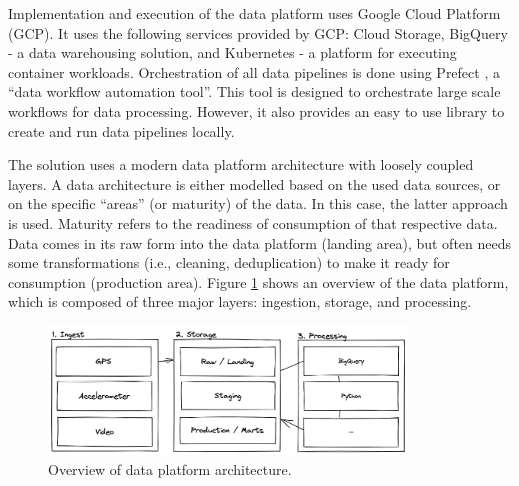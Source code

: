 Implementation and execution of the data platform uses Google Cloud Platform (GCP). It uses the following services provided by GCP: Cloud Storage, BigQuery - a data warehousing solution, and Kubernetes - a platform for executing container workloads. Orchestration of all data pipelines is done using Prefect \cite{Prefect}, a ``data workflow automation tool''. This tool is designed to orchestrate large scale workflows for data processing. However, it also provides an easy to use library to create and run data pipelines locally.

The solution uses a modern data platform architecture with loosely coupled layers. A data architecture is either modelled based on the used data sources, or on the specific ``areas'' (or maturity) of the data. In this case, the latter approach is used. Maturity refers to the readiness of consumption of that respective data. Data comes in its raw form into the data platform (landing area), but often needs some transformations (i.e., cleaning, deduplication) to make it ready for consumption (production area).  Figure \ref{fig:data-platform-architecture} shows an overview of the data platform, which is composed of three major layers: ingestion, storage, and processing.

\begin{figure}[H]
\begin{center}
\includegraphics[width=0.85\textwidth,keepaspectratio]{images/4_data/data-platform.png}
\end{center}
\captionsetup{width=.90\textwidth}
\caption{Overview of data platform architecture.}
\label{fig:data-platform-architecture}
\end{figure}

